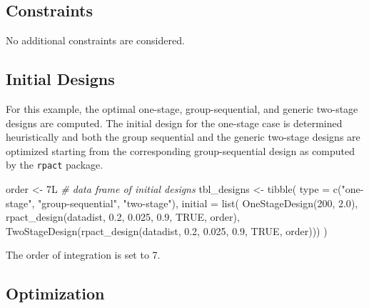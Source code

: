 \documentclass[
]{book}
\newenvironment{Shaded}{\begin{snugshade}}{\end{snugshade}}
\newcommand{\AttributeTok}[1]{\textcolor[rgb]{0.77,0.63,0.00}{#1}}
\newcommand{\CommentTok}[1]{\textcolor[rgb]{0.56,0.35,0.01}{\textit{#1}}}
\newcommand{\ConstantTok}[1]{\textcolor[rgb]{0.00,0.00,0.00}{#1}}
\newcommand{\DecValTok}[1]{\textcolor[rgb]{0.00,0.00,0.81}{#1}}
\newcommand{\FloatTok}[1]{\textcolor[rgb]{0.00,0.00,0.81}{#1}}
\newcommand{\FunctionTok}[1]{\textcolor[rgb]{0.00,0.00,0.00}{#1}}
\newcommand{\NormalTok}[1]{#1}
\newcommand{\OtherTok}[1]{\textcolor[rgb]{0.56,0.35,0.01}{#1}}
\newcommand{\StringTok}[1]{\textcolor[rgb]{0.31,0.60,0.02}{#1}}
\begin{document}
\hypertarget{constraints-14}{%
\subsection{Constraints}\label{constraints-14}}

No additional constraints are considered.

\hypertarget{initial-designs-1}{%
\subsection{Initial Designs}\label{initial-designs-1}}

For this example, the optimal one-stage, group-sequential, and generic
two-stage designs are computed.
The initial design for the one-stage case is determined heuristically
and both the group sequential and the generic two-stage designs are
optimized starting from the corresponding group-sequential design as
computed by the \texttt{rpact} package.

\begin{Shaded}
\begin{Highlighting}[]
\NormalTok{order }\OtherTok{\textless{}{-}}\NormalTok{ 7L}
\CommentTok{\# data frame of initial designs }
\NormalTok{tbl\_designs }\OtherTok{\textless{}{-}} \FunctionTok{tibble}\NormalTok{(}
    \AttributeTok{type    =} \FunctionTok{c}\NormalTok{(}\StringTok{"one{-}stage"}\NormalTok{, }\StringTok{"group{-}sequential"}\NormalTok{, }\StringTok{"two{-}stage"}\NormalTok{),}
    \AttributeTok{initial =} \FunctionTok{list}\NormalTok{(}
        \FunctionTok{OneStageDesign}\NormalTok{(}\DecValTok{200}\NormalTok{, }\FloatTok{2.0}\NormalTok{),}
        \FunctionTok{rpact\_design}\NormalTok{(datadist, }\FloatTok{0.2}\NormalTok{, }\FloatTok{0.025}\NormalTok{, }\FloatTok{0.9}\NormalTok{, }\ConstantTok{TRUE}\NormalTok{, order),}
        \FunctionTok{TwoStageDesign}\NormalTok{(}\FunctionTok{rpact\_design}\NormalTok{(datadist, }\FloatTok{0.2}\NormalTok{, }\FloatTok{0.025}\NormalTok{, }\FloatTok{0.9}\NormalTok{, }\ConstantTok{TRUE}\NormalTok{, order))) )}
\end{Highlighting}
\end{Shaded}

The order of integration is set to 7.

\hypertarget{optimization-13}{%
\subsection{Optimization}\label{optimization-13}}
\end{document}
